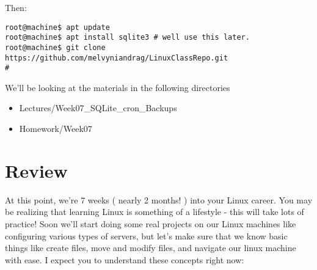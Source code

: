 \documentclass[12pt,a4paper]{article}
\begin{document}
Then:
\begin{lstlisting}[style=term]
root@machine$ apt update
root@machine$ apt install sqlite3 # well use this later.
root@machine$ git clone https://github.com/melvyniandrag/LinuxClassRepo.git
#\end{lstlisting}

We'll be looking at the materials in the following directories

\begin{itemize}
\item Lectures/Week07\_SQLite\_cron\_Backups
\item Homework/Week07
\end{itemize}

\section{Review}

At this point, we're 7 weeks ( nearly 2 months! ) into your Linux career. You
may be realizing that learning Linux is something of a lifestyle - this will
take lots of practice! Soon we'll start doing some real projects on our Linux
machines like configuring various types of servers, but let's make sure that we
know basic things like create files, move and modify files, and navigate our
linux machine with ease.
 I expect you to understand these concepts right
now:
\end{document}
